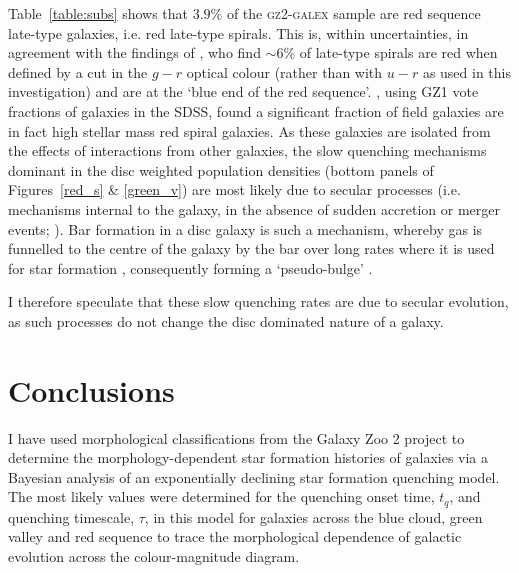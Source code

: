 Table~\ref{table:subs} shows that $3.9\%$ of the \textsc{gz2-galex} sample are red sequence late-type galaxies, i.e. red late-type spirals. This is, within uncertainties, in agreement with the findings of \citet{masters10c}, who find $\sim6\%$ of late-type spirals are red when defined by a cut in the $g-r$ optical colour (rather than with $u-r$ as used in this investigation) and are at the `blue end of the red sequence'. \citet{Bamford09}, using GZ1 vote fractions of galaxies in the SDSS, found a significant fraction of field galaxies are in fact high stellar mass red spiral galaxies. As these galaxies are isolated from the effects of interactions from other galaxies, the slow quenching mechanisms dominant in the disc weighted population densities (bottom panels of Figures~\ref{red_s} \& \ref{green_v}) are most likely due to secular processes (i.e. mechanisms internal to the galaxy, in the absence of sudden accretion or merger events; \citealt{kormendy04, Sheth12}). Bar formation in a disc galaxy is such a mechanism, whereby gas is funnelled to the centre of the galaxy by the bar over long rates where it is used for star formation \citep{masters12a, saintonge12, Cheung13}, consequently forming a `pseudo-bulge' \citep{Kormendy10, Simmons13}.

I therefore speculate that these slow quenching rates are due to secular evolution, as such processes do not change the disc dominated nature of a galaxy. 

\section{Conclusions}\label{morph:conc}

I have used morphological classifications from the Galaxy Zoo 2 project to determine the morphology-dependent star formation histories of galaxies via a Bayesian analysis of an exponentially declining star formation quenching model. The most likely values were determined for the quenching onset time, $t_q$, and quenching timescale, $\tau$, in this model for galaxies across the blue cloud, green valley and red sequence to trace the morphological dependence of galactic evolution across the colour-magnitude diagram. 

